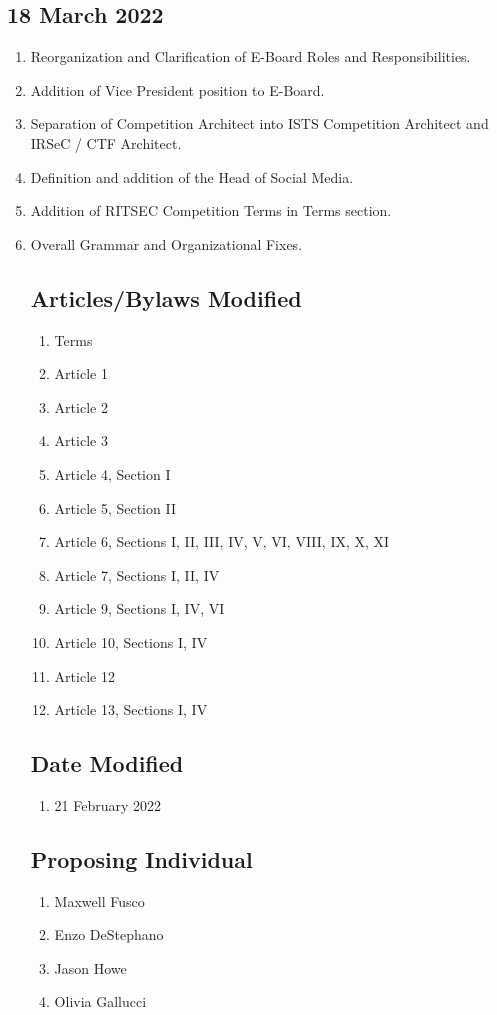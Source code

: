   \subsection{18 March 2022}
    \begin{enumerate}
      \item Reorganization and Clarification of E-Board Roles and Responsibilities. 
      \item Addition of Vice President position to E-Board. 
      \item Separation of Competition Architect into ISTS Competition Architect and IRSeC / CTF Architect.
      \item Definition and addition of the Head of Social Media.
      \item Addition of RITSEC Competition Terms in Terms section.
      \item Overall Grammar and Organizational Fixes.
  
        \subsection{Articles/Bylaws Modified}
        \begin{enumerate}
          \item Terms
          \item Article 1
          \item Article 2
          \item Article 3
          \item Article 4, Section I
          \item Article 5, Section II
          \item Article 6, Sections I, II, III, IV, V, VI, VIII, IX, X, XI
          \item Article 7, Sections I, II, IV
          \item Article 9, Sections I, IV, VI
          \item Article 10, Sections I, IV
          \item Article 12
          \item Article 13, Sections I, IV
        \end{enumerate} 
  
        \subsection{Date Modified}
        \begin{enumerate}
          \item 21 February 2022
        \end{enumerate}
  
        \subsection{Proposing Individual}
        \begin{enumerate}
          \item Maxwell Fusco
          \item Enzo DeStephano
          \item Jason Howe
          \item Olivia Gallucci
        \end{enumerate}
    \end{enumerate}
    
